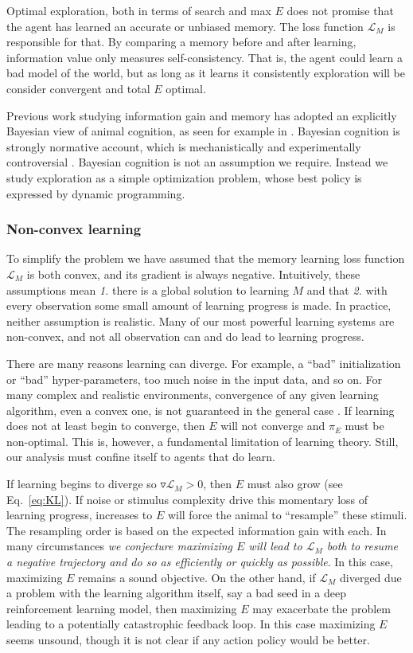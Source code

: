 \documentclass[9pt,twocolumn,twoside]{pnas-new}
\begin{document}
Optimal exploration, both in terms of search and max $E$ does not promise that the agent has learned an accurate or unbiased memory. The loss function $\mathcal{L}_M$ is responsible for that. By comparing a memory before and after learning, information value only measures self-consistency. That is, the agent could learn a bad model of the world, but as long as it learns it consistently exploration will be consider convergent and total $E$ optimal.

Previous work studying information gain and memory has adopted an explicitly Bayesian view of animal cognition, as seen for example in \cite{Itti2009,Friston2016}. Bayesian cognition is strongly normative account, which is mechanistically and experimentally controversial \cite{TODO}. Bayesian cognition is not an assumption we require. Instead we study exploration as a simple optimization problem, whose best policy is expressed by dynamic programming.

\subsubsection*{Non-convex learning}
To simplify the problem we have assumed that the memory learning loss function $\mathcal{L}_M$ is both convex, and its gradient is always negative. Intuitively, these assumptions mean \textit{1.} there is a global solution to learning $M$ and that \textit{2.} with every observation some small amount of learning progress is made. In practice, neither assumption is realistic. Many of our most powerful learning systems are non-convex, and not all observation can and do lead to learning progress. 

There are many reasons learning can diverge. For example, a ``bad'' initialization or ``bad'' hyper-parameters, too much noise in the input data, and so on. For many complex and realistic environments, convergence of any given learning algorithm, even a convex one, is not guaranteed in the general case \cite{Mackay}. If learning does not at least begin to converge, then $E$ will not converge and $\pi_E$ must be non-optimal. This is, however, a fundamental limitation of learning theory. Still, our analysis must confine itself to agents that do learn.

If learning begins to diverge so $\triangledown \mathcal{L}_M > 0$, then $E$ must also grow (see Eq.~\ref{eq:KL}). If noise or stimulus complexity drive this momentary loss of learning progress, increases to $E$ will force the animal to ``resample'' these stimuli. The resampling order is based on the expected information gain with each. In many circumstances \textit{we conjecture maximizing $E$ will lead to $\mathcal{L}_M$ both to resume a negative trajectory and do so as efficiently or quickly as possible}. In this case, maximizing $E$ remains a sound objective. On the other hand, if $\mathcal{L}_M$ diverged due a problem with the learning algorithm itself, say a bad seed in a deep reinforcement learning model, then maximizing $E$ may exacerbate the problem leading to a potentially catastrophic feedback loop. In this case maximizing $E$ seems unsound, though it is not clear if any action policy would be better. 
\end{document}
